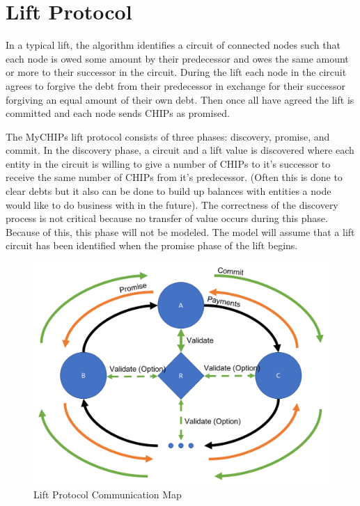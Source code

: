 \documentclass[article, onecolumn, 12pt]{IEEEtran}
\begin{document}
\section{Lift Protocol}
In a typical lift, the algorithm identifies a circuit of connected nodes such that each node is owed some amount by their predecessor and owes the same amount or more to their successor in the circuit. During the lift each node in the circuit agrees to forgive the debt from their predecessor in exchange for their successor forgiving an equal amount of their own debt. Then once all have agreed the lift is committed and each node sends CHIPs as promised.

The MyCHIPs lift protocol consists of three phases: discovery, promise, and commit. In the discovery phase, a circuit and a lift value is discovered where each entity in the circuit is willing to give a number of CHIPs to it's successor to receive the same number of CHIPs from it's predecessor. (Often this is done to clear debts but it also can be done to build up balances with entities a node would like to do business with in the future). The correctness of the discovery process is not critical because no transfer of value occurs during this phase. Because of this, this phase will not be modeled. The model will assume that a lift circuit has been identified when the promise phase of the lift begins.


\begin{figure}
    \centering
    \includegraphics[scale=0.7]{MyCHIPsLiftGraphic.png}
    \caption{Lift Protocol Communication Map}
    \label{fig:liftProt}
\end{figure}
\end{document}
